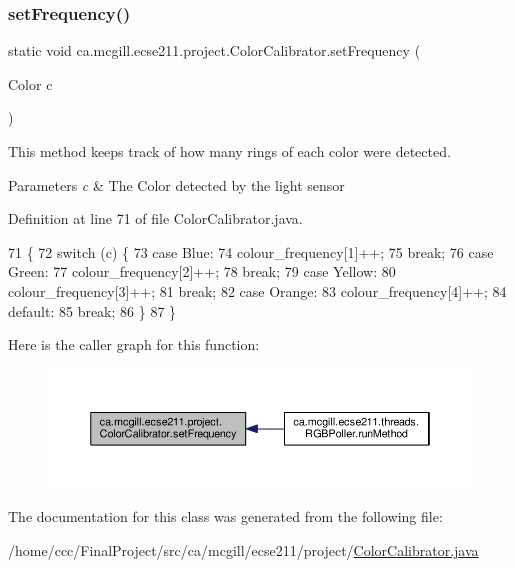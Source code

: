 \subsubsection{\texorpdfstring{set\+Frequency()}{setFrequency()}}
{\footnotesize\ttfamily static void ca.\+mcgill.\+ecse211.\+project.\+Color\+Calibrator.\+set\+Frequency (\begin{DoxyParamCaption}\item[{Color}]{c }\end{DoxyParamCaption})\hspace{0.3cm}{\ttfamily [static]}}

This method keeps track of how many rings of each color were detected.


\begin{DoxyParams}{Parameters}
{\em c} & The Color detected by the light sensor \\
\hline
\end{DoxyParams}


Definition at line 71 of file Color\+Calibrator.\+java.


\begin{DoxyCode}
71                                            \{
72     \textcolor{keywordflow}{switch} (c) \{
73       \textcolor{keywordflow}{case} Blue:
74         colour\_frequency[1]++;
75         \textcolor{keywordflow}{break};
76       \textcolor{keywordflow}{case} Green:
77         colour\_frequency[2]++;
78         \textcolor{keywordflow}{break};
79       \textcolor{keywordflow}{case} Yellow:
80         colour\_frequency[3]++;
81         \textcolor{keywordflow}{break};
82       \textcolor{keywordflow}{case} Orange:
83         colour\_frequency[4]++;
84       \textcolor{keywordflow}{default}:
85         \textcolor{keywordflow}{break};
86     \}
87   \}
\end{DoxyCode}
Here is the caller graph for this function\+:\nopagebreak
\begin{figure}[H]
\begin{center}
\leavevmode
\includegraphics[width=350pt]{classca_1_1mcgill_1_1ecse211_1_1project_1_1_color_calibrator_a40906193773ead0bfd582f188413c97a_icgraph}
\end{center}
\end{figure}


The documentation for this class was generated from the following file\+:\begin{DoxyCompactItemize}
\item 
/home/ccc/\+Final\+Project/src/ca/mcgill/ecse211/project/\hyperlink{_color_calibrator_8java}{Color\+Calibrator.\+java}\end{DoxyCompactItemize}
